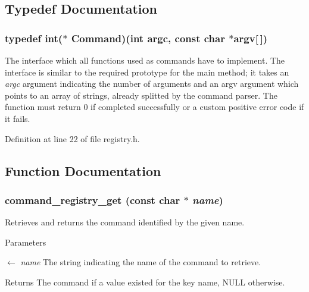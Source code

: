 \subsection{Typedef Documentation}
\subsubsection[{Command}]{\setlength{\rightskip}{0pt plus 5cm}typedef int($\ast$  {\bf Command})(int argc, const char $\ast$argv[$\,$])}\label{dc/d40/commands_2registry_8h_ac0200b58bf9c0740f333a0e05cf5b110}
The interface which all functions used as commands have to implement. The interface is similar to the required prototype for the {\ttfamily main} method; it takes an {\itshape argc\/} argument indicating the number of arguments and an {\ttfamily argv} argument which points to an array of strings, already splitted by the command parser. The function must return 0 if completed successfully or a custom positive error code if it fails. 

Definition at line 22 of file registry.h.



\subsection{Function Documentation}
\subsubsection[{command\_\-registry\_\-get}]{ command\_\-registry\_\-get (const char $\ast$ {\em name})}\label{dc/d40/commands_2registry_8h_aa752f6a6d85b4df8dd793e77a41fc481}
Retrieves and returns the command identified by the given name.


\begin{DoxyParams}{Parameters}
\item[\mbox{$\leftarrow$} {\em name}]The string indicating the name of the command to retrieve.\end{DoxyParams}
\begin{DoxyReturn}{Returns}
The command if a value existed for the key name, NULL otherwise. 
\end{DoxyReturn}

